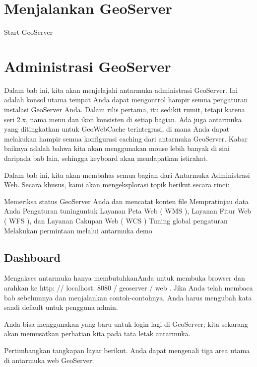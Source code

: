 \documentclass[]{book}
\begin{document}
\hypertarget{menjalankan-geoserver}{%
\section{Menjalankan GeoServer}\label{menjalankan-geoserver}}

\label{fig:embed3}Start GeoServer

\hypertarget{administrasi-geoserver}{%
\section{Administrasi GeoServer}\label{administrasi-geoserver}}

Dalam bab ini, kita akan menjelajahi antarmuka administrasi GeoServer. Ini adalah konsol utama tempat Anda dapat mengontrol hampir semua pengaturan instalasi GeoServer Anda. Dalam rilis pertama, itu sedikit rumit, tetapi karena seri 2.x, nama menu dan ikon konsisten di setiap bagian. Ada juga antarmuka yang ditingkatkan untuk GeoWebCache terintegrasi, di mana Anda dapat melakukan hampir semua konfigurasi caching dari antarmuka GeoServer. Kabar baiknya adalah bahwa kita akan menggunakan mouse lebih banyak di sini daripada bab lain, sehingga keyboard akan mendapatkan istirahat.

Dalam bab ini, kita akan membahas semua bagian dari Antarmuka Administrasi Web. Secara khusus, kami akan mengeksplorasi topik berikut secara rinci:

Memeriksa status GeoServer Anda dan mencatat konten file
Mempratinjau data Anda
Pengaturan tuninguntuk Layanan Peta Web ( WMS ), Layanan Fitur Web ( WFS ), dan Layanan Cakupan Web ( WCS )
Tuning global pengaturan
Melakukan permintaan melalui antarmuka demo

\hypertarget{dashboard}{%
\subsection{Dashboard}\label{dashboard}}

Mengakses antarmuka hanya membutuhkanAnda untuk membuka browser dan arahkan ke http: // localhost: 8080 / geoserver / web . Jika Anda telah membaca bab sebelumnya dan menjalankan contoh-contohnya, Anda harus mengubah kata sandi default untuk pengguna admin.

Anda bisa menggunakan yang baru untuk login lagi di GeoServer; kita sekarang akan memusatkan perhatian kita pada tata letak antarmuka.

Pertimbangkan tangkapan layar berikut. Anda dapat mengenali tiga area utama di antarmuka web GeoServer:
\end{document}

